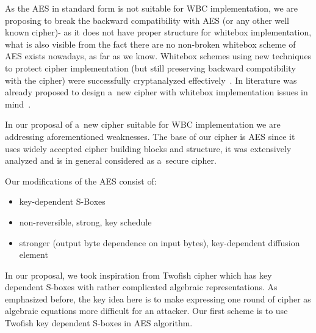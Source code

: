 \documentclass[11pt,oneside,final]{fithesis2}
\begin{document}
    As the AES in standard form is not suitable for WBC implementation, we are proposing to break the backward compatibility with AES (or any other well known cipher)- as it does not have proper structure for whitebox implementation, what is 
    also visible from the fact there are no non-broken whitebox scheme of AES exists nowadays, as far as we know. Whitebox schemes using new techniques to protect cipher implementation
    (but still preserving backward compatibility with the cipher) were successfully cryptanalyzed effectively~\citep{Billet:2004:CWB:2080787.2080809, Michiels:2007:MST:1314276.1314291, conf/indocrypt/MulderWP10, conf/sacrypt/MulderRP12}.    
    In literature was already proposed to design a~new cipher with whitebox implementation issues in mind~\citep{Billet:2004:CWB:2080787.2080809, wyseurPhd}. 
    
    In our proposal of a~new cipher suitable for WBC implementation we are addressing aforementioned weaknesses. The base of our cipher is AES since it uses widely accepted
    cipher building blocks and structure, it was extensively analyzed and is in general considered as a~secure cipher.
	
    Our modifications of the AES consist of:
    \begin{itemize}
     \item key-dependent S-Boxes
     \item non-reversible, strong, key schedule
     \item stronger (output byte dependence on input bytes), key-dependent diffusion element
    \end{itemize}

    In our proposal, we took inspiration from Twofish \cite{Schneier98twofish:a} cipher which has key dependent S-boxes with rather
    complicated algebraic representations. As emphasized before, the key idea here is to make expressing one round of cipher as algebraic equations
    more difficult for an attacker. Our first scheme is to use Twofish key dependent S-boxes in AES algorithm. 
\end{document}
